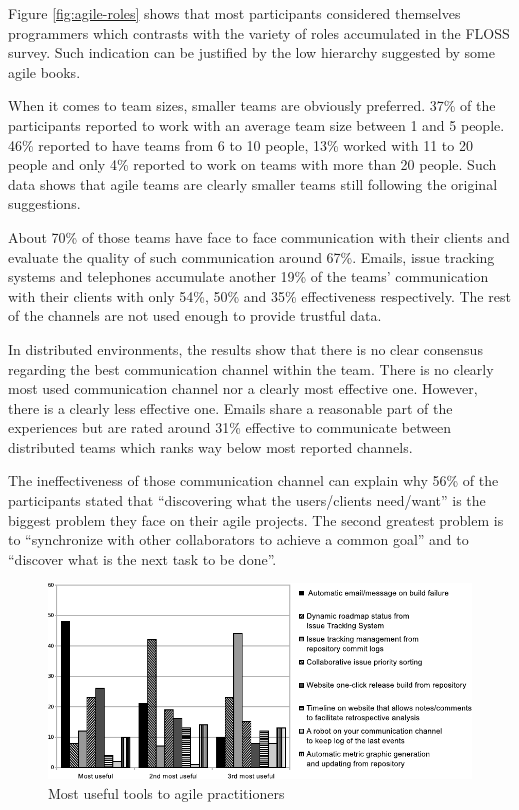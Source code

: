 \documentclass[lnbip]{svmultln}
\begin{document}
Figure \ref{fig:agile-roles} shows that most participants considered
themselves programmers which contrasts with the variety of roles
accumulated in the FLOSS survey. Such indication can be justified by
the low hierarchy suggested by some agile books.

When it comes to team sizes, smaller teams are obviously
preferred. 37\% of the participants reported to work with an average
team size between 1 and 5 people. 46\% reported to have teams from 6
to 10 people, 13\% worked with 11 to 20 people and only 4\% reported
to work on teams with more than 20 people. Such data shows that agile
teams are clearly smaller teams still following the original
suggestions.

About 70\% of those teams have face to face communication with their
clients and evaluate the quality of such communication around
67\%. Emails, issue tracking systems and telephones accumulate another
19\% of the teams' communication with their clients with only 54\%,
50\% and 35\% effectiveness respectively. The rest of the channels are
not used enough to provide trustful data.

In distributed environments, the results show that there is no clear
consensus regarding the best communication channel within the
team. There is no clearly most used communication channel nor a
clearly most effective one. However, there is a clearly less effective
one. Emails share a reasonable part of the experiences but are rated
around 31\% effective to communicate between distributed teams which
ranks way below most reported channels.

The ineffectiveness of those communication channel can explain why
56\% of the participants stated that ``discovering what the
users/clients need/want'' is the biggest problem they face on their
agile projects. The second greatest problem is to ``synchronize with
other collaborators to achieve a common goal'' and to ``discover what
is the next task to be done''.

\begin{figure}[hbt]
  \centering
  \includegraphics[scale=.8]{agile-tools.pdf}
  \caption{Most useful tools to agile practitioners}
  \label{fig:agile-tools}
\end{figure}
\end{document}
